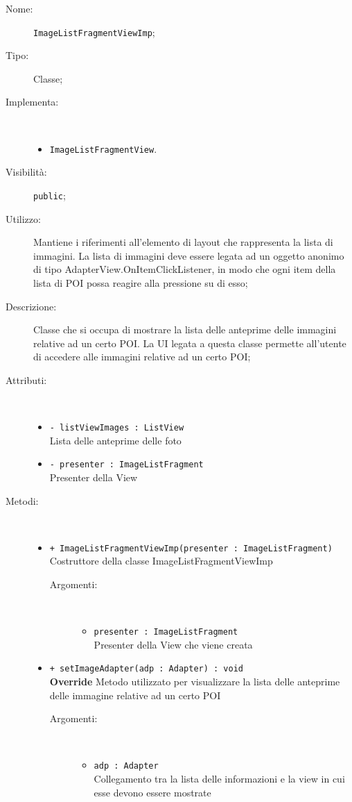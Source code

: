 \documentclass[../DefinizioneDiProdotto.tex]{subfiles}
\begin{document}
    \begin{description}
\item[Nome:] \texttt{ImageListFragmentViewImp};
\item[Tipo:] Classe;
\item[Implementa:] \
\begin{itemize}
\item \texttt{ImageListFragmentView}.

\end{itemize}
\item[Visibilità:] \texttt{public};
\item[Utilizzo:] Mantiene i riferimenti all'elemento di layout che rappresenta la lista di immagini. La lista di immagini deve essere legata ad un oggetto anonimo di tipo AdapterView.OnItemClickListener, in modo che ogni item della lista di POI possa reagire alla pressione su di esso;
\item[Descrizione:] Classe che si occupa di mostrare la lista delle anteprime delle immagini relative ad un certo POI. La UI legata a questa classe permette all'utente di accedere alle immagini relative ad un certo POI;
\item[Attributi:] \
\begin{itemize}
\item \texttt{- listViewImages : ListView}\\
Lista delle anteprime delle foto

\item \texttt{- presenter : ImageListFragment}\\
Presenter della View

\end{itemize}
\item[Metodi:] \
\begin{itemize}
\item \texttt{+ ImageListFragmentViewImp(presenter : ImageListFragment)}\\
Costruttore della classe ImageListFragmentViewImp
 \begin{description}
\item[Argomenti:] \
\begin{itemize}
\item \texttt{presenter : ImageListFragment}\\
Presenter della View che viene creata\end{itemize}
\end{description}
\item \texttt{+ setImageAdapter(adp : Adapter) : void}\\
\textbf{Override} Metodo utilizzato per visualizzare la lista delle anteprime delle immagine relative ad un certo POI
 \begin{description}
\item[Argomenti:] \
\begin{itemize}
\item \texttt{adp : Adapter}\\
Collegamento tra la lista delle informazioni e la view in cui esse devono essere mostrate\end{itemize}
\end{description}
\end{itemize}
\end{description}
\end{document}
